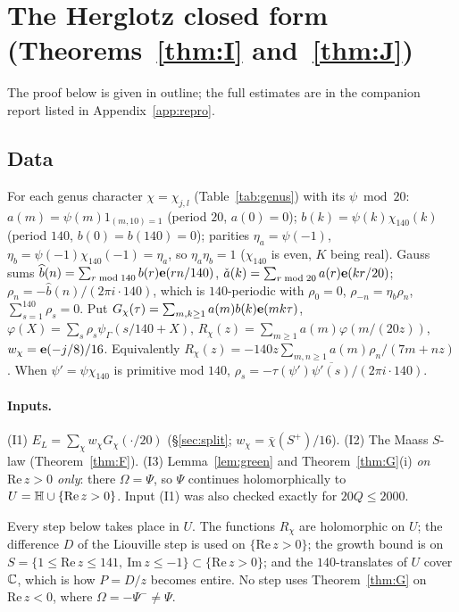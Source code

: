 
\section{The Herglotz closed form (Theorems~\ref{thm:I} and~\ref{thm:J})}\label{sec:herglotz}
The proof below is given in outline; the full estimates are in the companion report listed in Appendix~\ref{app:repro}.

\subsection{Data}
For each genus character $\chi=\chi_{j,l}$ (Table~\ref{tab:genus}) with its $\psi\bmod20$: $a(m)=\psi(m)1_{(m,10)=1}$ (period $20$, $a(0)=0$);
$b(k)=\psi(k)\chi_{140}(k)$ (period $140$, $b(0)=b(140)=0$); parities $\eta_a=\psi(-1)$, $\eta_b=\psi(-1)\chi_{140}(-1)=\eta_a$, so
$\eta_a\eta_b=1$ ($\chi_{140}$ is even, $K$ being real). Gauss sums
$\widehat b(n)=\sum_{r\bmod140}b(r)\mathbf{e}(rn/140)$, $\check a(k)=\sum_{r\bmod20}a(r)\mathbf{e}(kr/20)$; $\rho_n=-\widehat b(n)/(2\pi i\cdot140)$, which is
$140$-periodic with $\rho_0=0$, $\rho_{-n}=\eta_b\rho_n$, $\sum_{s=1}^{140}\rho_s=0$. Put $G_\chi(\tau)=\sum_{m,k\ge1}a(m)b(k)\mathbf{e}(mk\tau)$,
$\varphi(X)=\sum_s\rho_s\psi_\Gamma(s/140+X)$, $R_\chi(z)=\sum_{m\ge1}a(m)\varphi(m/(20z))$, $w_\chi=\mathbf{e}(-j/8)/16$. Equivalently
$R_\chi(z)=-140z\sum_{m,n\ge1}a(m)\rho_n/(7m+nz)$. When $\psi'=\psi\chi_{140}$ is primitive mod $140$, $\rho_s=-\tau(\psi')\overline{\psi'(s)}/(2\pi i\cdot140)$.

\paragraph{Inputs.} (I1) $E_L=\sum_\chi w_\chi G_\chi(\cdot/20)$ (\S\ref{sec:split}; $w_\chi=\bar\chi(S^+)/16$). (I2) The Maass $S$-law
(Theorem~\ref{thm:F}). (I3) Lemma~\ref{lem:green} and Theorem~\ref{thm:G}(i) \emph{on $\mathrm{Re}\,z>0$ only}: there $\Omega=\Psi$, so $\Psi$ continues
holomorphically to $U=\mathbb{H}\cup\{\mathrm{Re}\,z>0\}$. Input (I1) was also checked exactly for $20Q\le2000$.

\begin{remark}\label{rem:herglotzG}
Every step below takes place in $U$. The functions $R_\chi$ are holomorphic on $U$; the difference $D$ of the Liouville step is used on
$\{\mathrm{Re}\,z>0\}$; the growth bound is on $S=\{1\le\mathrm{Re}\,z\le141,\ \mathrm{Im}\,z\le-1\}\subset\{\mathrm{Re}\,z>0\}$; and the $140$-translates of
$U$ cover $\mathbb{C}$, which is how $P=D/z$ becomes entire. No step uses Theorem~\ref{thm:G} on $\mathrm{Re}\,z<0$, where $\Omega=-\Psi^-\neq\Psi$.
\end{remark}

